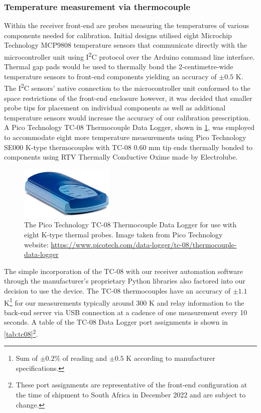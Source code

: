 \subsubsection{Temperature measurement via thermocouple}
Within the receiver front-end are probes measuring the temperatures of various components needed for calibration. Initial designs utilised eight Microchip Technology MCP9808 temperature sensors that communicate directly with the microcontroller unit using I\textsuperscript{2}C protocol over the Arduino command line interface. Thermal gap pads would be used to thermally bond the 2-centimetre-wide temperature sensors to front-end components yielding an accuracy of $\pm 0.5$ K. The I\textsuperscript{2}C sensors’ native connection to the microcontroller unit conformed to the space restrictions of the front-end enclosure however, it was decided that smaller probe tips for placement on individual components as well as additional temperature sensors would increase the accuracy of our calibration prescription. A Pico Technology TC-08 Thermocouple Data Logger, shown in \cref{fig:tc08}, was employed to accommodate eight more temperature measurements using Pico Technology SE000 K-type thermocouples with TC-08 0.60 mm tip ends thermally bonded to components using RTV Thermally Conductive Oxime made by Electrolube.
\begin{figure}
    \centering
    \includegraphics[width=0.4\textwidth]{tc08}
    \caption{The Pico Technology TC-08 Thermocouple Data Logger for use with eight K-type thermal probes. Image taken from Pico Technology website: \url{https://www.picotech.com/data-logger/tc-08/thermocouple-data-logger}}
    \label{fig:tc08}
\end{figure}
The simple incorporation of the TC-08 with our receiver automation software through the manufacturer’s proprietary Python libraries also factored into our decision to use the device. The TC-08 thermocouples have an accuracy of $\pm 1.1$ K\footnote{Sum of $\pm0.2$\% of reading and $\pm0.5$ K according to manufacturer specifications.} for our measurements typically around 300 K and relay information to the back-end server via USB connection at a cadence of one measurement every 10 seconds. A table of the TC-08 Data Logger port assignments is shown in \cref{tab:tc08}\footnote{These port assignments are representative of the front-end configuration at the time of shipment to South Africa in December 2022 and are subject to change.}.

